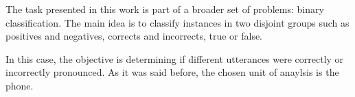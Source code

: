 The task presented in this work is part of a broader set of problems: binary classification.
The main idea is to classify instances in two disjoint groups such as positives and negatives,
corrects and incorrects, true or false.

In this case, the objective is determining if different utterances were correctly or incorrectly 
pronounced. As it was said before, the chosen unit of anaylsis is the phone.
